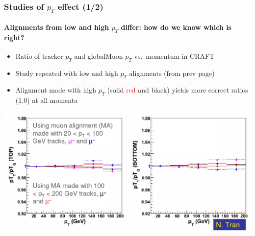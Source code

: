 \documentclass[compress]{beamer}
\begin{document}
\begin{frame}
\frametitle{Studies of $p_T$ effect (1/2)}
\framesubtitle{Alignments from low and high $p_T$ differ: how do we know which is right?}

\begin{itemize}
\item Ratio of tracker $p_T$ and globalMuon $p_T$ vs.\ momentum in CRAFT
\item Study repeated with low and high $p_T$ alignments {\scriptsize (from prev page)}
\item Alignment made with high $p_T$ (solid \textcolor{red}{red} and black) yields more correct ratios (1.0) at all momenta
\end{itemize}

\vfill\includegraphics[width=\linewidth]{cosmicsplitting_nhan.png}
\end{frame}
\end{document}
